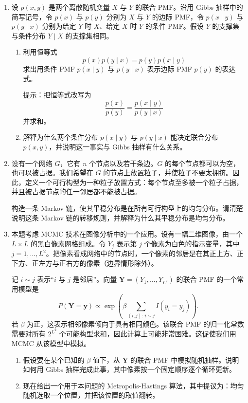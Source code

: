 \documentclass[UTF8,12pt,a4paper,fontset=fandol]{ctexart}
\begin{document}
\begin{enumerate}
  \item 设 $p(x,y)$ 是两个离散随机变量 $X$ 与 $Y$ 的联合 PMF。沿用 Gibbs 抽样中的简写记号，令 $p(x)$ 与 $p(y)$ 分别为 $X$ 与 $Y$ 的边际 PMF，令 $p(x\mid y)$ 与 $p(y\mid x)$ 分别为给定 $Y$ 时 $X$、给定 $X$ 时 $Y$ 的条件 PMF。假设 $Y$ 的支撑集与条件分布 $Y\mid X$ 的支撑集相同。

  \begin{enumerate}
    \item[(a)] 利用恒等式
    \[
      p(x)p(y\mid x)=p(y)p(x\mid y)
    \]
    求出用条件 PMF $p(x\mid y)$ 与 $p(y\mid x)$ 表示边际 PMF $p(y)$ 的表达式。

    提示：把恒等式改写为
    \[
      \frac{p(x)}{p(y)}=\frac{p(x\mid y)}{p(y\mid x)}
    \]
    并求和。

    \item[(b)] 解释为什么两个条件分布 $p(x\mid y)$ 与 $p(y\mid x)$ 能决定联合分布 $p(x,y)$，并说明这一事实与 Gibbs 抽样有什么关系。
  \end{enumerate}

  \item 设有一个网络 $G$，它有 $n$ 个节点以及若干条边。$G$ 的每个节点都可以为空，也可以被占据。我们希望在 $G$ 的节点上放置粒子，并使粒子不要太拥挤。因此，定义一个可行构型为一种粒子放置方式：每个节点至多被一个粒子占据，并且被占据节点的任一邻居都不能被占据。

  构造一条 Markov 链，使其平稳分布是在所有可行构型上的均匀分布。请清楚说明这条 Markov 链的转移规则，并解释为什么其平稳分布是均匀分布。

  \item 本题考虑 MCMC 技术在图像分析中的一个应用。设有一幅二维图像，由一个 $L\times L$ 的黑白像素网格组成。令 $Y_j$ 表示第 $j$ 个像素为白色的指示变量，其中 $j=1,\ldots,L^2$。把像素看成网络中的节点时，一个像素的邻居是在其正上方、正下方、正左方与正右方的像素（边界情形除外）。

  记 $i\sim j$ 表示“$i$ 与 $j$ 是邻居”。向量 $\mathbf Y=(Y_1,\ldots,Y_{L^2})$ 的联合 PMF 的一个常用模型是
  \[
    P(\mathbf Y=\mathbf y)\propto
    \exp\left(
      \beta\sum_{(i,j):\,i\sim j} I(y_i=y_j)
    \right).
  \]
  若 $\beta$ 为正，这表示相邻像素倾向于具有相同颜色。该联合 PMF 的归一化常数需要对所有 $2^{L^2}$ 个可能构型求和，因此计算上可能非常困难。这促使我们用 MCMC 从该模型中模拟。

  \begin{enumerate}
    \item[(a)] 假设要在某个已知的 $\beta$ 值下，从 $\mathbf Y$ 的联合 PMF 中模拟随机抽样。说明如何用 Gibbs 抽样完成此事，其中像素按一个固定顺序逐个循环更新。

    \item[(b)] 现在给出一个用于本问题的 Metropolis-Hastings 算法，其中提议为：均匀随机选取一个位置，并把该位置的取值翻转。
  \end{enumerate}
\end{enumerate}
\end{document}
